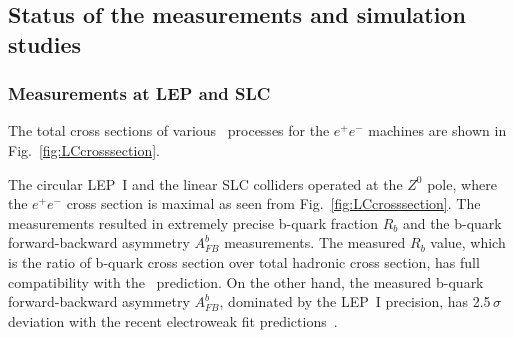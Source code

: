 %


%
\subsection{Status of the measurements and simulation studies}

\subsubsection{Measurements at LEP and SLC}
The total cross sections of various \sm\ processes for the $e^+e^-$ machines are shown in Fig.~\ref{fig:LCcrosssection}.

The circular LEP~I and the linear SLC colliders operated at the $Z^0$ pole, where the $e^+e^-$ cross section is maximal as seen from Fig.~\ref{fig:LCcrosssection}.
The measurements resulted in extremely precise b-quark fraction $R_b$ and the b-quark forward-backward asymmetry $A_{FB}^b$ measurements. 
The measured $R_b$ value, which is the ratio of b-quark cross section over total hadronic cross section, has full compatibility with the \sm\ prediction. 
On the other hand, the measured b-quark forward-backward asymmetry $A_{FB}^b$, dominated by the LEP~I precision, has 2.5\,$\sigma$ deviation with the recent electroweak fit predictions~\cite{bib:AfbSMFit}.


